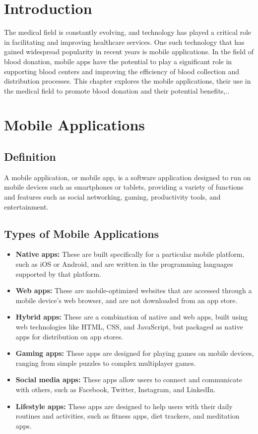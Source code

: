 

\section{Introduction}
\label{sec:contribution}
The medical field is constantly evolving, and technology has played a critical role in facilitating and improving healthcare services. One such technology that has gained widespread popularity in recent years is mobile applications. In the field of blood donation, mobile apps have the potential to play a significant role in supporting blood centers and improving the efficiency of blood collection and distribution processes. This chapter explores the mobile applications, their use in the medical field to promote blood donation and their potential benefits,..

\section{Mobile Applications}
\label{sec:organization}
\subsection{Definition}

A mobile application, or mobile app, is a software application designed to run on mobile devices such as smartphones or tablets, providing a variety of functions and features such as social networking, gaming, productivity tools, and entertainment.

\subsection{Types of Mobile Applications}

\begin{itemize}
\item \textbf{Native apps:} These are built specifically for a particular mobile platform, such as iOS or Android, and are written in the programming languages supported by that platform.
\item \textbf{Web apps:} These are mobile-optimized websites that are accessed through a mobile device's web browser, and are not downloaded from an app store.
\item \textbf{Hybrid apps:} These are a combination of native and web apps, built using web technologies like HTML, CSS, and JavaScript, but packaged as native apps for distribution on app stores.
\item \textbf{Gaming apps:} These apps are designed for playing games on mobile devices, ranging from simple puzzles to complex multiplayer games.
\item \textbf{Social media apps:} These apps allow users to connect and communicate with others, such as Facebook, Twitter, Instagram, and LinkedIn.
\item \textbf{Lifestyle apps:} These apps are designed to help users with their daily routines and activities, such as fitness apps, diet trackers, and meditation apps.
\end{itemize}

